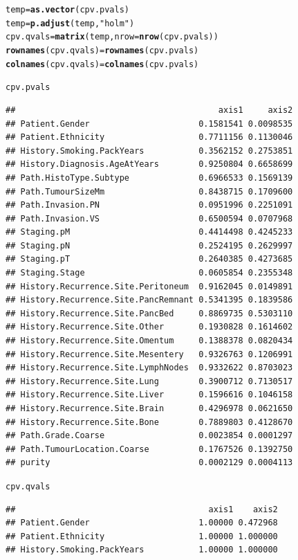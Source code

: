 \documentclass{article}\usepackage[]{graphicx}\usepackage[]{color}
\makeatletter
\newcommand{\hlstr}[1]{\textcolor[rgb]{0.192,0.494,0.8}{#1}}%
\newcommand{\hlstd}[1]{\textcolor[rgb]{0.345,0.345,0.345}{#1}}%
\newcommand{\hlkwb}[1]{\textcolor[rgb]{0.69,0.353,0.396}{#1}}%
\newcommand{\hlkwc}[1]{\textcolor[rgb]{0.333,0.667,0.333}{#1}}%
\newcommand{\hlkwd}[1]{\textcolor[rgb]{0.737,0.353,0.396}{\textbf{#1}}}%
\newenvironment{kframe}{%
 \def\at@end@of@kframe{}%
 \ifinner\ifhmode%
  \def\at@end@of@kframe{\end{minipage}}%
  \begin{minipage}{\columnwidth}%
 \fi\fi%
 \def\FrameCommand##1{\hskip\@totalleftmargin \hskip-\fboxsep
 \colorbox{shadecolor}{##1}\hskip-\fboxsep
     \hskip-\linewidth \hskip-\@totalleftmargin \hskip\columnwidth}%
 \MakeFramed {\advance\hsize-\width
   \@totalleftmargin\z@ \linewidth\hsize
   \@setminipage}}%
 {\par\unskip\endMakeFramed%
 \at@end@of@kframe}
\newenvironment{knitrout}{}{} %
\makeatother
\begin{document}
\begin{knitrout}
\begin{kframe}
\begin{alltt}
\hlstd{temp} \hlkwb{=} \hlkwd{as.vector}\hlstd{(cpv.pvals)}
\hlstd{temp} \hlkwb{=} \hlkwd{p.adjust}\hlstd{(temp,} \hlstr{"holm"}\hlstd{)}
\hlstd{cpv.qvals} \hlkwb{=} \hlkwd{matrix}\hlstd{(temp,} \hlkwc{nrow} \hlstd{=} \hlkwd{nrow}\hlstd{(cpv.pvals))}
\hlkwd{rownames}\hlstd{(cpv.qvals)} \hlkwb{=} \hlkwd{rownames}\hlstd{(cpv.pvals)}
\hlkwd{colnames}\hlstd{(cpv.qvals)} \hlkwb{=} \hlkwd{colnames}\hlstd{(cpv.pvals)}

\hlstd{cpv.pvals}
\end{alltt}
\begin{verbatim}
##                                         axis1     axis2
## Patient.Gender                      0.1581541 0.0098535
## Patient.Ethnicity                   0.7711156 0.1130046
## History.Smoking.PackYears           0.3562152 0.2753851
## History.Diagnosis.AgeAtYears        0.9250804 0.6658699
## Path.HistoType.Subtype              0.6966533 0.1569139
## Path.TumourSizeMm                   0.8438715 0.1709600
## Path.Invasion.PN                    0.0951996 0.2251091
## Path.Invasion.VS                    0.6500594 0.0707968
## Staging.pM                          0.4414498 0.4245233
## Staging.pN                          0.2524195 0.2629997
## Staging.pT                          0.2640385 0.4273685
## Staging.Stage                       0.0605854 0.2355348
## History.Recurrence.Site.Peritoneum  0.9162045 0.0149891
## History.Recurrence.Site.PancRemnant 0.5341395 0.1839586
## History.Recurrence.Site.PancBed     0.8869735 0.5303110
## History.Recurrence.Site.Other       0.1930828 0.1614602
## History.Recurrence.Site.Omentum     0.1388378 0.0820434
## History.Recurrence.Site.Mesentery   0.9326763 0.1206991
## History.Recurrence.Site.LymphNodes  0.9332622 0.8703023
## History.Recurrence.Site.Lung        0.3900712 0.7130517
## History.Recurrence.Site.Liver       0.1596616 0.1046158
## History.Recurrence.Site.Brain       0.4296978 0.0621650
## History.Recurrence.Site.Bone        0.7889803 0.4128670
## Path.Grade.Coarse                   0.0023854 0.0001297
## Path.TumourLocation.Coarse          0.1767526 0.1392750
## purity                              0.0002129 0.0004113
\end{verbatim}
\begin{alltt}
\hlstd{cpv.qvals}
\end{alltt}
\begin{verbatim}
##                                       axis1    axis2
## Patient.Gender                      1.00000 0.472968
## Patient.Ethnicity                   1.00000 1.000000
## History.Smoking.PackYears           1.00000 1.000000

\end{verbatim}
\end{kframe}
\end{knitrout}
\end{document}
